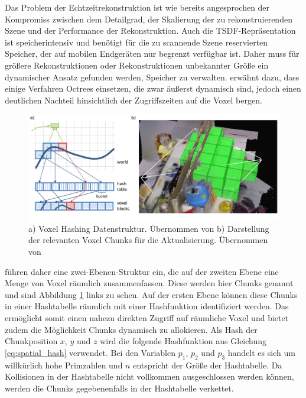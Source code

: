 Das Problem der Echtzeitrekonstruktion ist wie bereits angesprochen der Kompromiss zwischen dem Detailgrad, der Skalierung der zu rekonstruierenden Szene und der Performance der Rekonstruktion. Auch die TSDF-Repräsentation ist speicherintensiv und benötigt für die zu scannende Szene reservierten Speicher, der auf mobilen Endgeräten nur begrenzt verfügbar ist. Daher muss für größere Rekonstruktionen oder Rekonstruktionen unbekannter Größe ein dynamischer Ansatz gefunden werden, Speicher zu verwalten. \citet{Klingensmith_2015_7924} erwähnt dazu, dass einige Verfahren Octrees einsetzen, die zwar äußerst dynamisch sind, jedoch einen deutlichen Nachteil hinsichtlich der Zugriffszeiten auf die Voxel bergen. 

\begin{figure}[h]
  \centering
	\includegraphics[width=1.0\textwidth]{content/images/methods/hashing.png} 
  \caption{a) Voxel Hashing Datenstruktur. Übernommen von \citet{niessner2013real} b) Darstellung der relevanten Voxel Chunks für die Aktualisierung. Übernommen von \citet{Klingensmith_2015_7924}}
  \label{fig:hashing}
\end{figure}

\citet{niessner2013real} führen daher eine zwei-Ebenen-Struktur ein, die auf der zweiten Ebene eine Menge von Voxel räumlich zusammenfassen. Diese werden hier Chunks genannt und sind Abbildung \ref{fig:hashing} links zu sehen. Auf der ersten Ebene können diese Chunks in einer Hashtabelle räumlich mit einer Hashfunktion identifiziert werden. Das ermöglicht somit einen nahezu direkten Zugriff auf räumliche Voxel und bietet zudem die Möglichkeit Chunks dynamisch zu allokieren. Als Hash der Chunkposition \(x\), \(y\) und \(z\) wird die folgende Hashfunktion aus Gleichung \ref{eq:spatial_hash} verwendet. Bei den Variablen \(p_1\), \(p_2\) und \(p_3\) handelt es sich um willkürlich hohe Primzahlen und \(n\) entspricht der Größe der Hashtabelle. Da Kollisionen in der Hashtabelle nicht vollkommen ausgeschlossen werden können, werden die Chunks gegebenenfalls in der Hashtabelle verkettet.

